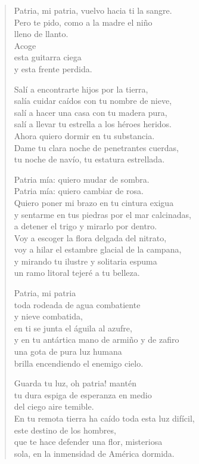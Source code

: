 \documentclass[12pt]{article}
\begin{document}
\clearpage
{}
\begin{verse}

Patria, mi patria, vuelvo hacia ti la sangre.\\
Pero te pido, como a la madre el niño\\
lleno de llanto.\\
Acoge\\
esta guitarra ciega\\
y esta frente perdida.  

Salí a encontrarte hijos por la tierra,\\
salía cuidar caídos con tu nombre de nieve,\\
salí a hacer una casa con tu madera pura,\\
salí a llevar tu estrella a los héroes heridos.\\
Ahora quiero dormir en tu substancia.\\
Dame tu clara noche de penetrantes cuerdas,\\
tu noche de navío, tu estatura estrellada.  

Patria mía: quiero mudar de sombra.\\
Patria mía: quiero cambiar de rosa.\\
Quiero poner mi brazo en tu cintura exigua\\
y sentarme en tus piedras por el mar calcinadas,\\
a detener el trigo y mirarlo por dentro.\\
Voy a escoger la flora delgada del nitrato,\\
voy a hilar el estambre glacial de la campana,\\
y mirando tu ilustre y solitaria espuma\\
un ramo litoral tejeré a tu belleza.  

Patria, mi patria\\
toda rodeada de agua combatiente\\
y nieve combatida,\\
en ti se junta el águila al azufre,\\
y en tu antártica mano de armiño y de zafiro\\
una gota de pura luz humana\\
brilla encendiendo el enemigo cielo.  

Guarda tu luz, oh patria! mantén\\
tu dura espiga de esperanza en medio\\
del ciego aire temible.\\
En tu remota tierra ha caído toda esta luz difícil,\\
este destino de los hombres,\\
que te hace defender una flor, misteriosa\\
sola, en la inmensidad de América dormida.  

\end{verse}
\end{document}

